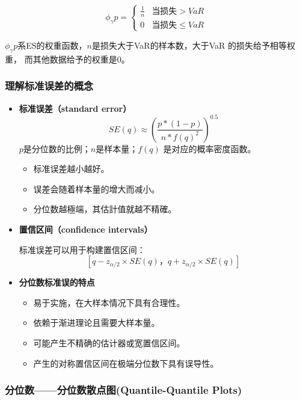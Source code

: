 \[
\phi_\gamma{p} =
\begin{cases}
\frac{1}{n} & \text{当损失} > VaR \\
0 & \text{当损失} \leq VaR
\end{cases}
\]

\(\phi_\gamma{p}\)系ES的权重函数，\(n\)是损失大于VaR的样本数，大于VaR 的损失给予相等权重， 而其他数据给予的权重是0。




\subsubsection{理解标准误差的概念}
\begin{itemize}
    \item \textbf{标准误差（standard error）}
    \[SE(q)≈(\frac{p*(1-p)}{n*f(q)^2})^{0.5}\]
      \(p\)是分位数的比例；\(n\)是样本量；\(f(q)\) 是对应的概率密度函数。
      \begin{itemize}
          \item 标准误差越小越好。
          \item 误差会随着样本量的增大而减小。
          \item 分位数越極端，其估計值就越不精確。
      \end{itemize}

      
    


    \item \textbf{置信区间（confidence intervals）}
    
    标准误差可以用于构建置信区间：
      \[
\left[q - z_{\alpha/2} \times SE(q)， q + z_{\alpha/2} \times SE(q)\right]
\]
    
\item \textbf{分位数标准误的特点}
\begin{itemize}
    \item 易于实施，在大样本情况下具有合理性。
\item 依赖于渐进理论且需要大样本量。
\item 可能产生不精确的估计器或宽置信区间。
\item 产生的对称置信区间在极端分位数下具有误导性。
\end{itemize} 



\end{itemize}




 


\subsubsection{分位数——分位数散点图(Quantile-Quantile Plots)}

